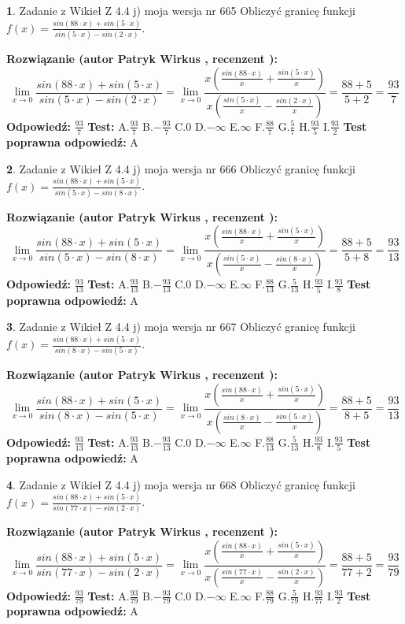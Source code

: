 \documentclass[12pt, a4paper]{article}
\theoremstyle{definition} %
\newtheorem{zad}{}
\newcommand{\zadStart}[1]{\begin{zad}#1\newline}
\newcommand{\zadStop}{\end{zad}}
\newcommand{\rozwStart}[2]{\noindent \textbf{Rozwiązanie (autor #1 , recenzent #2): }\newline}
\newcommand{\rozwStop}{\newline}
\newcommand{\odpStart}{\noindent \textbf{Odpowiedź:}\newline}
\newcommand{\odpStop}{\newline}
\newcommand{\testStart}{\noindent \textbf{Test:}\newline}
\newcommand{\testStop}{\newline}
\newcommand{\kluczStart}{\noindent \textbf{Test poprawna odpowiedź:}\newline}
\newcommand{\kluczStop}{\newline}
\begin{document}
\zadStart{Zadanie z Wikieł Z 4.4 j) moja wersja nr 665}
Obliczyć granicę funkcji $f(x)=\frac{sin(88\cdot x) +sin(5\cdot x)}{sin(5\cdot x) -sin(2\cdot x)}$.
\zadStop
\rozwStart{Patryk Wirkus}{}
$$\lim\limits_{x\to 0}\frac{sin(88\cdot x) +sin(5\cdot x)}{sin(5\cdot x) -sin(2\cdot x)}=\lim\limits_{x\to 0}\frac{x(\frac{sin(88\cdot x)}{x}+\frac{sin(5\cdot x)}{x})}{x(\frac{sin(5\cdot x)}{x}-\frac{sin(2\cdot x)}{x})}=\frac{88+5}{5+2} = \frac{93}{7}$$
\rozwStop
\odpStart
$\frac{93}{7}$
\odpStop
\testStart
A.$\frac{93}{7}$
B.$-\frac{93}{7}$
C.$0$
D.$-\infty$
E.$\infty$
F.$\frac{88}{7}$
G.$\frac{5}{7}$
H.$\frac{93}{5}$
I.$\frac{93}{2}$
\testStop
\kluczStart
A
\kluczStop



\zadStart{Zadanie z Wikieł Z 4.4 j) moja wersja nr 666}
Obliczyć granicę funkcji $f(x)=\frac{sin(88\cdot x) +sin(5\cdot x)}{sin(5\cdot x) -sin(8\cdot x)}$.
\zadStop
\rozwStart{Patryk Wirkus}{}
$$\lim\limits_{x\to 0}\frac{sin(88\cdot x) +sin(5\cdot x)}{sin(5\cdot x) -sin(8\cdot x)}=\lim\limits_{x\to 0}\frac{x(\frac{sin(88\cdot x)}{x}+\frac{sin(5\cdot x)}{x})}{x(\frac{sin(5\cdot x)}{x}-\frac{sin(8\cdot x)}{x})}=\frac{88+5}{5+8} = \frac{93}{13}$$
\rozwStop
\odpStart
$\frac{93}{13}$
\odpStop
\testStart
A.$\frac{93}{13}$
B.$-\frac{93}{13}$
C.$0$
D.$-\infty$
E.$\infty$
F.$\frac{88}{13}$
G.$\frac{5}{13}$
H.$\frac{93}{5}$
I.$\frac{93}{8}$
\testStop
\kluczStart
A
\kluczStop



\zadStart{Zadanie z Wikieł Z 4.4 j) moja wersja nr 667}
Obliczyć granicę funkcji $f(x)=\frac{sin(88\cdot x) +sin(5\cdot x)}{sin(8\cdot x) -sin(5\cdot x)}$.
\zadStop
\rozwStart{Patryk Wirkus}{}
$$\lim\limits_{x\to 0}\frac{sin(88\cdot x) +sin(5\cdot x)}{sin(8\cdot x) -sin(5\cdot x)}=\lim\limits_{x\to 0}\frac{x(\frac{sin(88\cdot x)}{x}+\frac{sin(5\cdot x)}{x})}{x(\frac{sin(8\cdot x)}{x}-\frac{sin(5\cdot x)}{x})}=\frac{88+5}{8+5} = \frac{93}{13}$$
\rozwStop
\odpStart
$\frac{93}{13}$
\odpStop
\testStart
A.$\frac{93}{13}$
B.$-\frac{93}{13}$
C.$0$
D.$-\infty$
E.$\infty$
F.$\frac{88}{13}$
G.$\frac{5}{13}$
H.$\frac{93}{8}$
I.$\frac{93}{5}$
\testStop
\kluczStart
A
\kluczStop



\zadStart{Zadanie z Wikieł Z 4.4 j) moja wersja nr 668}
Obliczyć granicę funkcji $f(x)=\frac{sin(88\cdot x) +sin(5\cdot x)}{sin(77\cdot x) -sin(2\cdot x)}$.
\zadStop
\rozwStart{Patryk Wirkus}{}
$$\lim\limits_{x\to 0}\frac{sin(88\cdot x) +sin(5\cdot x)}{sin(77\cdot x) -sin(2\cdot x)}=\lim\limits_{x\to 0}\frac{x(\frac{sin(88\cdot x)}{x}+\frac{sin(5\cdot x)}{x})}{x(\frac{sin(77\cdot x)}{x}-\frac{sin(2\cdot x)}{x})}=\frac{88+5}{77+2} = \frac{93}{79}$$
\rozwStop
\odpStart
$\frac{93}{79}$
\odpStop
\testStart
A.$\frac{93}{79}$
B.$-\frac{93}{79}$
C.$0$
D.$-\infty$
E.$\infty$
F.$\frac{88}{79}$
G.$\frac{5}{79}$
H.$\frac{93}{77}$
I.$\frac{93}{2}$
\testStop
\kluczStart
A
\kluczStop
\end{document}

